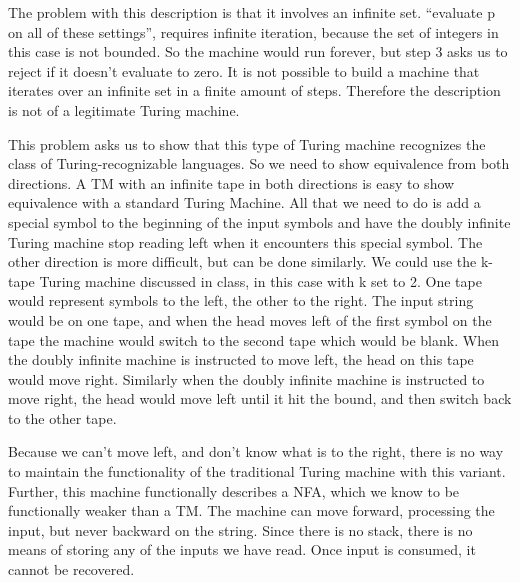 \begin{problem}{4}
  \begin{solution}
    The problem with this description is that it involves an infinite set. ``evaluate p on all of these settings'',
    requires infinite iteration, because the set of integers in this case is not bounded. So the machine would run
    forever, but step 3 asks us to reject if it doesn't evaluate to zero. It is not possible to build a machine that
    iterates over an infinite set in a finite amount of steps.  Therefore the description is not of a legitimate Turing
    machine.
  \end{solution}
\end{problem}

\begin{problem}{5}
  \begin{solution}

  \end{solution}
\end{problem}

\begin{problem}{6}
  \begin{solution}
    This problem asks us to show that this type of Turing machine recognizes the class of Turing-recognizable languages.
    So we need to show equivalence from both directions.
    \br
    A TM with an infinite tape in both directions is easy to show equivalence with a standard Turing Machine.  All that
    we need to do is add a special symbol to the beginning of the input symbols and have the doubly infinite Turing
    machine stop reading left when it encounters this special symbol.
    \br
    The other direction is more difficult, but can be done similarly.  We could use the k-tape Turing machine discussed
    in class, in this case with k set to 2.  One tape would represent symbols to the left, the other to the right. The
    input string would be on one tape, and when the head moves left of the first symbol on the tape the machine would
    switch to the second tape which would be blank. When the doubly infinite machine is instructed to move left, the
    head on this tape would move right.  Similarly when the doubly infinite machine is instructed to move right, the
    head would move left until it hit the bound, and then switch back to the other tape.
  \end{solution}
\end{problem}

\begin{problem}{7}
  \begin{solution}
    Because we can't move left, and don't know what is to the right, there is no way to maintain the functionality of
    the traditional Turing machine with this variant.  Further, this machine functionally describes a NFA, which we know
    to be functionally weaker than a TM. The machine can move forward, processing the input, but never backward on the
    string. Since there is no stack, there is no means of storing any of the inputs we have read. Once input is
    consumed, it cannot be recovered.
  \end{solution}
\end{problem}

